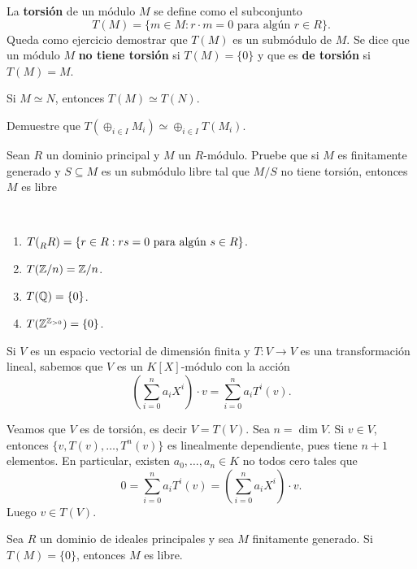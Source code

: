 La \textbf{torsión} de un módulo $M$ se define como
el subconjunto 
\[
T(M)=\{m\in M:r\cdot m=0\text{ para algún $r\in R$}\}.
\]
Queda como ejercicio demostrar que $T(M)$ es un submódulo de $M$. 
Se dice que un módulo $M$ 
\textbf{no tiene torsión} si $T(M)=\{0\}$ y que es \textbf{de torsión} si $T(M)=M$.   

\begin{exercise}
Si $M\simeq N$, entonces $T(M)\simeq T(N)$.
\end{exercise}

\begin{exercise}
Demuestre que $T(\oplus_{i\in I}M_i)\simeq \oplus_{i\in I}T(M_i)$.
\end{exercise}

\begin{exercise}
\label{xca:free}
    Sean $R$ un dominio principal y $M$ un $R$-módulo. Pruebe que si $M$ es
    finitamente generado y $S\subseteq M$ es un submódulo libre tal que $M/S$ no
    tiene torsión, entonces $M$ es libre
\end{exercise}

\begin{examples}\
\begin{enumerate}
\item $T(\prescript{}{R}R)=\{r\in R:rs=0\text{ para algún $s\in R$}\}$.
\item $T(\mathbb{Z}/n)=\mathbb{Z}/n$.
\item $T(\mathbb{Q})=\{0\}$.
\item $T(\mathbb{Z}^{\mathbb{Z}_{>0}})=\{0\}$. 
\end{enumerate}
\end{examples}

\begin{example}
Si $V$ es un espacio vectorial de dimensión finita y $T\colon V\to V$ es una
transformación lineal, sabemos que $V$ es un $K[X]$-módulo con la acción
\[
\left(\sum_{i=0}^n a_iX^i\right)\cdot v=\sum_{i=0}^n a_iT^i(v).
\]

Veamos que
$V$ es de torsión, es decir $V=T(V)$. Sea $n=\dim V$. Si $v\in V$, entonces 
$\{v,T(v),\dots,T^n(v)\}$ es linealmente dependiente, pues
tiene $n+1$ elementos. En particular, existen $a_0,\dots,a_n\in K$ no todos cero tales
que 
\[
0=\sum_{i=0}^n a_iT^i(v)=\left(\sum_{i=0}^n a_iX^i\right)\cdot v.
\]
Luego $v\in T(V)$. 
\end{example}

\begin{theorem}
Sea $R$ un dominio de ideales principales  
y sea $M$ finitamente generado. Si $T(M)=\{0\}$, entonces $M$ es libre. 
\end{theorem}

